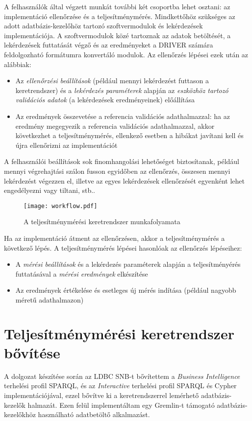 A felhasználók által végzett munkát további két csoportba lehet osztani: az implementáció ellenőrzése és a teljesítménymérés. Mindkettőhöz szükséges az adott adatbázis-kezelőhöz tartozó szoftvermodulok és lekérdezések implementációja. A szoftvermodulok közé tartoznak az adatok betöltését, a lekérdezések futtatását végző és az eredményeket a DRIVER számára feldolgozható formátumra konvertáló modulok. Az ellenőrzés lépései ezek után az alábbiak:
\begin{itemize}
	\item Az \textit{ellenőrzési beállítások} (például mennyi lekérdezést futtason a keretrendszer) és a \textit{lekérdezés paraméterek} alapján az \textit{eszközhöz tartozó validációs adatok} (a lekérdezések eredményeinek) előállítása
	\item Az eredmények összevetése a referencia validációs adathalmazzal: ha az eredmény megegyezik a referencia validációs adathalmazzal, akkor következhet a teljesítménymérés, ellenkező esetben a hibákat javítani kell és újra ellenőrizni az implementációt
\end{itemize}
A felhasználói beállítások sok finomhangolási lehetőséget biztosítanak, például mennyi végrehajtási szálon fusson egyidőben az ellenőrzés, összesen mennyi lekérdezést végezzen el, illetve az egyes lekérdezések ellenőrzését egyenként lehet engedélyezni vagy tiltani, stb..

\begin{figure}[h]
	\centering
	\texttt{[image: workflow.pdf]}
	\caption{A teljesítménymérési keretrendszer munkafolyamata}
	\label{fig:workflow}
\end{figure}

Ha az implementáció átment az ellenőrzésen, akkor a teljesítménymérés a következő lépés. A teljesítménymérés lépései hasonlóak az ellenőrzés lépéseihez:
\begin{itemize}
	\item A \textit{mérési beállítások} és a lekérdezés paraméterek alapján a teljesítményérés futtatásával a \textit{mérési eredmények} elkészítése
	\item Az eredmények értékelése és esetleges új mérés indítása (például nagyobb méretű adathalmazon)
\end{itemize}

\section{Teljesítménymérési keretrendszer bővítése}
A dolgozat készítése során az LDBC SNB-t bővítettem a \textit{Business Intelligence} terhelési profil SPARQL, és az \textit{Interactive} terhelési profil SPARQL és Cypher implementációjával, ezzel bővítve ki a keretrendszerrel lemérhető adatbázis-kezelők halmazát. Ezen felül implementáltam egy Gremlin-t támogató adatbázis-kezelőkhöz használható adatbetöltő alkalmazást.
